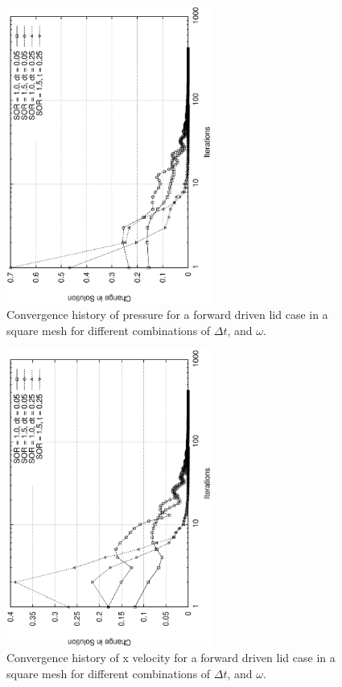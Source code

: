 \documentclass[a4paper, 10pt]{article}
\begin{document}
\begin{enumerate}[I]
    
    \begin{figure}
      \centering
      \includegraphics[width=0.6\textwidth, angle = -90]{../plot/basic/convergence/convP.eps}
      \caption{Convergence history of pressure for a forward driven lid case in a square mesh for different combinations of $\Delta t$, and $\omega$.}
      \label{ch2}
    \end{figure}
    \begin{figure}
      \centering
      \includegraphics[width=0.6\textwidth, angle = -90]{../plot/basic/convergence/convU.eps}
      \caption{Convergence history of x velocity for a forward driven lid case in a square mesh for different combinations of $\Delta t$, and $\omega$.}
      \label{ch3}
    \end{figure}


\end{enumerate}
\end{document}
